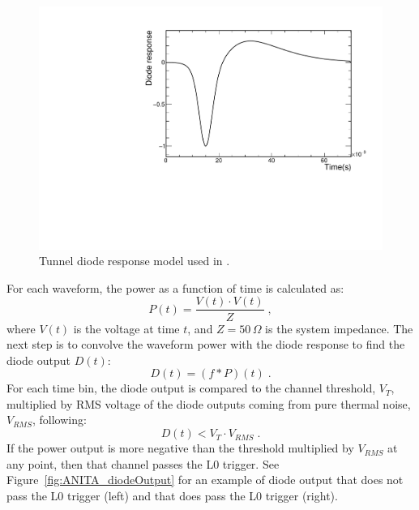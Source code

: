 \begin{figure}[!h]\centering
  \includegraphics[width=.45\linewidth]{./Figs/FullBand_diodeResponse.pdf}
  \caption{Tunnel diode response model used in \icemc.}
  \label{fig:ANITA_diodeModel}
\end{figure}

For each waveform, the power as a function of time is calculated as:
\begin{equation}
  P (t) = \dfrac{V(t) \cdot V(t)}{Z} \;,
\end{equation}
\noindent where $V(t)$ is the voltage at time $t$, and $Z=50\,\Omega$ is the system impedance.
The next step is to convolve the waveform power with the diode
response to find the diode output $D(t)$:
\begin{equation}
  D(t) = (f * P)(t) \;.
\end{equation}
For each time bin, the diode output is compared to the channel
threshold, $V_T$, multiplied by RMS voltage of the diode outputs coming from pure thermal noise, $V_{RMS}$, following:
\begin{equation} 
  D(t) < V_T \cdot V_{RMS} \;.
\end{equation}
If the power output is more negative than the threshold multiplied by $V_{RMS}$ at any point, then that channel passes the L0 trigger.
  See Figure~\ref{fig:ANITA_diodeOutput} for an example of diode
  output that does not pass the L0 trigger (left) and that does pass
  the L0 trigger (right).

